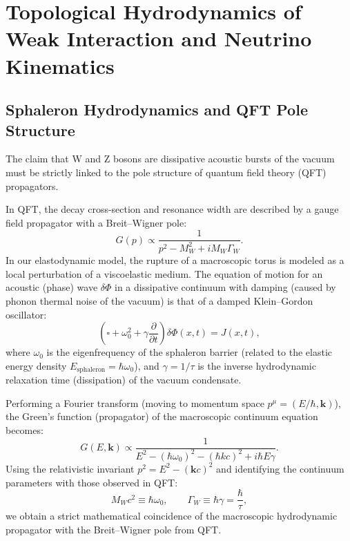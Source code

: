 \documentclass[11pt,a4paper]{article}
\begin{document}
\section{Topological Hydrodynamics of Weak Interaction and Neutrino Kinematics}

\subsection{Sphaleron Hydrodynamics and QFT Pole Structure}
The claim that W and Z bosons are dissipative acoustic bursts of the vacuum must be strictly linked to the pole structure of quantum field theory (QFT) propagators.

In QFT, the decay cross-section and resonance width are described by a gauge field propagator with a Breit–Wigner pole:
\begin{equation}
G(p) \propto \frac{1}{p^2 - M_W^2 + i M_W \Gamma_W}.
\end{equation}
In our elastodynamic model, the rupture of a macroscopic torus is modeled as a local perturbation of a viscoelastic medium. The equation of motion for an acoustic (phase) wave $\delta \Phi$ in a dissipative continuum with damping (caused by phonon thermal noise of the vacuum) is that of a damped Klein–Gordon oscillator:
\begin{equation}
\left( \square + \omega_0^2 + \gamma \frac{\partial}{\partial t} \right) \delta \Phi(x,t) = J(x,t),
\end{equation}
where $\omega_0$ is the eigenfrequency of the sphaleron barrier (related to the elastic energy density $E_{\text{sphaleron}} = \hbar \omega_0$), and $\gamma = 1/\tau$ is the inverse hydrodynamic relaxation time (dissipation) of the vacuum condensate.

Performing a Fourier transform (moving to momentum space $p^\mu = (E/\hbar, \mathbf{k})$), the Green's function (propagator) of the macroscopic continuum equation becomes:
\begin{equation}
G(E, \mathbf{k}) \propto \frac{1}{E^2 - (\hbar\omega_0)^2 - (\hbar k c)^2 + i \hbar E \gamma}.
\end{equation}
Using the relativistic invariant $p^2 = E^2 - (\mathbf{k}c)^2$ and identifying the continuum parameters with those observed in QFT:
\begin{equation}
M_W c^2 \equiv \hbar \omega_0, \qquad \Gamma_W \equiv \hbar \gamma = \frac{\hbar}{\tau},
\end{equation}
we obtain a strict mathematical coincidence of the macroscopic hydrodynamic propagator with the Breit–Wigner pole from QFT.
\end{document}
